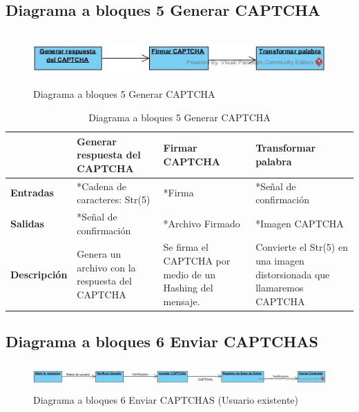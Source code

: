 \subsection{Diagrama a bloques 5 Generar CAPTCHA}
\begin{figure}[H]
	\includegraphics[width=1\linewidth, height=2cm]{./images/bloques5.jpg}
	\caption{Diagrama a bloques 5 Generar CAPTCHA}
	\label{fig:5-5-1}
\end{figure}
\begin{table}[H]
 \centering
   {
     \begin{tabular}{| p{4cm} | p{4cm} | p{4cm} | p{4cm} |}
     \hline
     & \textbf{Generar respuesta del CAPTCHA} & \textbf{Firmar CAPTCHA} & \textbf{Transformar palabra}\\
     \hline
     \textbf{Entradas} & *Cadena de caracteres: Str(5) & *Firma & *Señal de confirmación\\
     \hline
     \textbf{Salidas} & *Señal de confirmación & *Archivo Firmado & *Imagen CAPTCHA\\
     \hline
     \textbf{Descripción} & Genera un archivo con la respuesta del CAPTCHA  & Se firma el CAPTCHA por medio de un Hashing del mensaje. & Convierte el Str(5) en una imagen distorsionada que llamaremos CAPTCHA\\
	\hline
    \end{tabular}
    }
    \caption{Diagrama a bloques 5 Generar CAPTCHA}
    \label{tabla:b5}
\end{table}

\subsection{Diagrama a bloques 6 Enviar CAPTCHAS}
\begin{figure}[H]
	\includegraphics[width=1\linewidth, height=1cm]{./images/bloques6.jpg}
	\caption{Diagrama a bloques 6 Enviar CAPTCHAS (Usuario existente)}
	\label{fig:5-6-1}
\end{figure}

